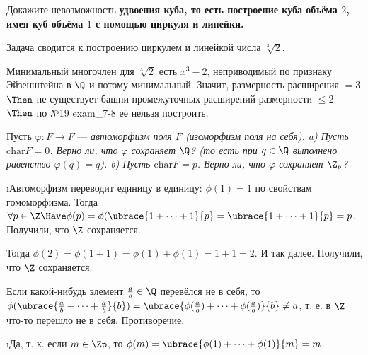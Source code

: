 \begin{problem}[39 (9.12а)]
Докажите невозможность \bf{удвоения куба}, то есть построение куба объёма $2$, имея куб объёма $1$ с помощью циркуля и линейки.
\end{problem}

\begin{solution}
Задача сводится к построению циркулем и линейкой числа \(\sqrt[3]{2}\).

Минимальный многочлен для $\sqrt[3]{2}$ есть $x^3 - 2$, неприводимый по признаку Эйзенштейна в $\Q$ и потому минимальный.
Значит, размерность расширения $= 3$ $\Then$ не существует башни промежуточных расширений размерности $\le 2$ $\Then$ по №19 exam\_7-8 её нельзя построить.

\end{solution}

\begin{problem}[40 (10.2)]
Пусть $\varphi: F \to F$ --- \it{автоморфизм поля} $F$ (изоморфизм поля на себя). 
a) Пусть $\mathrm{char} F =0$. Верно ли, что $\varphi$ сохраняет $\Q$? (то есть при $q\in\Q$ выполнено равенство $\varphi(q)=q$).
b) Пусть $\mathrm{char} F =p$. Верно ли, что $\varphi$ сохраняет $\Z_p$?
\end{problem}

\begin{solution}
\begin{enumerate}
\def\labelenumi{\alph{enumi})}
\i Автоморфизм переводит единицу в единицу: \(\phi(1) = 1\) по свойствам гомоморфизма.
Тогда \(\forall p \in \Z \Have \phi(p) = \phi(\ubrace{1+\dots+1}{p} = \ubrace{1+\dots+1}{p} = p\). Получили, что \(\Z\) сохраняется.

Тогда $\phi(2) = \phi(1+1) = \phi(1)+\phi(1)=1+1=2$.
И так далее. Получили, что $\Z$ сохраняется.

Если какой-нибудь элемент $\frac{a}{b} \in \Q$ перевёлся не в себя, то $\phi(\ubrace{\frac{a}{b}+\dots+\frac{a}{b}}{b}) = \ubrace{\phi(\frac{a}{b})+\dots+\phi(\frac{a}{b})}{b} \ne a$, т. е. в $\Z$ что-то перешло не в себя. Противоречие.
%

\i Да, т. к. если \(m \in \Zp\), то \(\phi(m) = \ubrace{\phi(1)+\dots+\phi(1)}{m} = m\)
\end{enumerate}
\end{solution}

